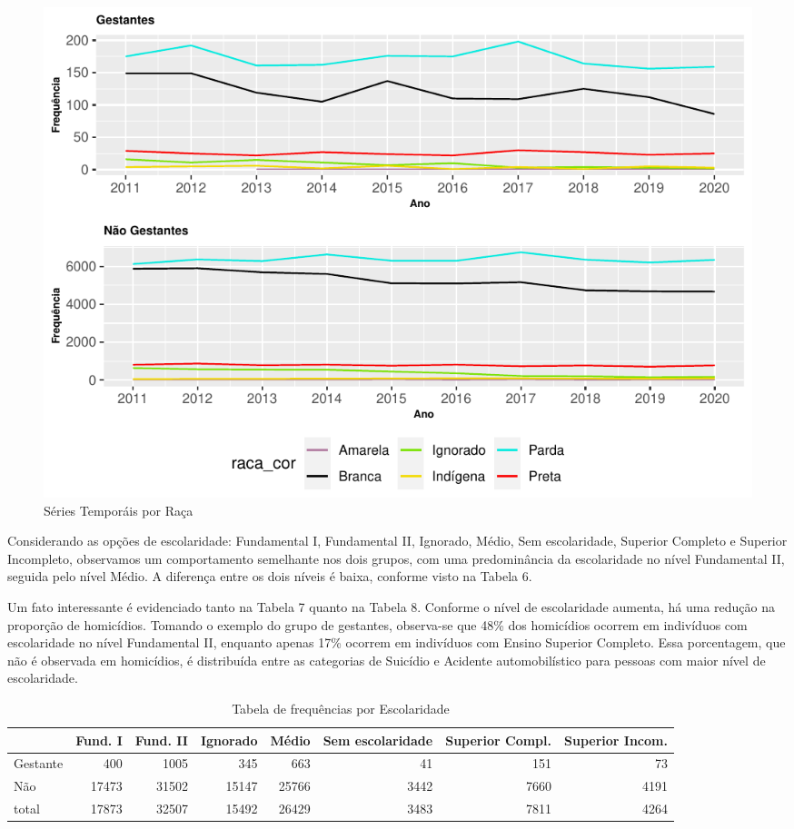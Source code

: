 \documentclass[
]{article}
\begin{document}
\begin{figure}
\centering
\includegraphics{RelatorioV01_files/figure-latex/unnamed-chunk-6-1.pdf}
\caption{Séries Temporáis por Raça}
\end{figure}

Considerando as opções de escolaridade: Fundamental I, Fundamental II,
Ignorado, Médio, Sem escolaridade, Superior Completo e Superior
Incompleto, observamos um comportamento semelhante nos dois grupos, com
uma predominância da escolaridade no nível Fundamental II, seguida pelo
nível Médio. A diferença entre os dois níveis é baixa, conforme visto na
Tabela 6.

Um fato interessante é evidenciado tanto na Tabela 7 quanto na Tabela 8.
Conforme o nível de escolaridade aumenta, há uma redução na proporção de
homicídios. Tomando o exemplo do grupo de gestantes, observa-se que 48\%
dos homicídios ocorrem em indivíduos com escolaridade no nível
Fundamental II, enquanto apenas 17\% ocorrem em indivíduos com Ensino
Superior Completo. Essa porcentagem, que não é observada em homicídios,
é distribuída entre as categorias de Suicídio e Acidente automobilístico
para pessoas com maior nível de escolaridade.

\begin{table}

\caption{\label{tab:unnamed-chunk-7}Tabela de frequências por Escolaridade}
\centering
\begin{tabular}[t]{l|r|r|r|r|r|r|r}
\hline
  & Fund. I & Fund. II & Ignorado & Médio & Sem escolaridade & Superior Compl. & Superior Incom.\\
\hline
Gestante & 400 & 1005 & 345 & 663 & 41 & 151 & 73\\
\hline
Não & 17473 & 31502 & 15147 & 25766 & 3442 & 7660 & 4191\\
\hline
total & 17873 & 32507 & 15492 & 26429 & 3483 & 7811 & 4264\\
\hline
\end{tabular}
\end{table}
\end{document}
